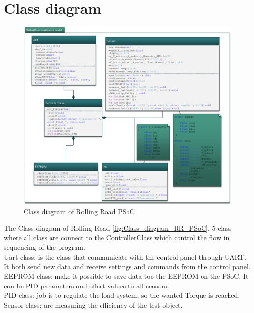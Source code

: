 \section{Class diagram}




\begin{figure}[H]
	\centering
	\includegraphics [width=6in]{Software/Pictures/klassediagram.png}
	\caption{Class diagram of Rolling Road PSoC}
	\label{fig:Class_diagram_RR_PSoC}
\end{figure}

The Class diagram of Rolling Road \vref{fig:Class_diagram_RR_PSoC}. 5 class where all class are connect to the ControllerClass which control the flow in sequencing of the program.\\
Uart class: is the class that communicate with the control panel through UART. It both send new data and receive settings and commands from the control panel. \\
EEPROM class: make it possible to save data too the EEPROM on the PSoC. It can be PID parameters and offset values to all sensors.\\
PID class: job is to regulate the load system, so the wanted Torque is reached. \\
Sensor class: are measuring the efficiency of the test object.

